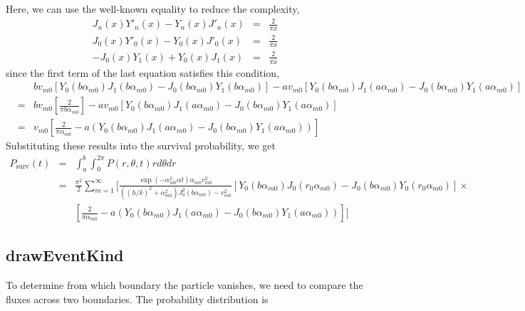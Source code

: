\documentclass{article}
\begin{document}
%
Here, we can use the well-known equality to reduce the complexity,
%
\begin{eqnarray}
    J_n(x)Y'_n(x) - Y_n(x)J'_n(x) &=& \frac{2}{\pi x} \\
    J_0(x)Y'_0(x) - Y_0(x)J'_0(x) &=& \frac{2}{\pi x} \nonumber\\
    -J_0(x)Y_1(x) + Y_0(x)J_1(x)  &=& \frac{2}{\pi x} \nonumber
\end{eqnarray}
%
since the first term of the last equation satisfies this condition,
%
\begin{eqnarray}
    & & bv_{m0}\left[Y_0(b\alpha_{m0})J_1(b\alpha_{m0}) - J_0(b\alpha_{m0})Y_1(b\alpha_{m0})\right] -
        av_{m0}\left[Y_0(b\alpha_{m0})J_1(a\alpha_{m0}) - J_0(b\alpha_{m0})Y_1(a\alpha_{m0})\right]
\nonumber\\
    &=& bv_{m0}\left[\frac{2}{\pi b\alpha_{m0}}\right] -
        av_{m0}\left[Y_0(b\alpha_{m0})J_1(a\alpha_{m0}) - J_0(b\alpha_{m0})Y_1(a\alpha_{m0})\right]
\nonumber\\
    &=& v_{m0}\left[\frac{2}{\pi\alpha_{m0}} - a\left(Y_0(b\alpha_{m0})J_1(a\alpha_{m0}) - J_0(b\alpha_{m0})Y_1(a\alpha_{m0})\right)\right]
\end{eqnarray}
%
Substituting these results into the survival probability, we get
%
\begin{eqnarray}
    P_{\mathrm{surv}}(t) &=& \int_a^b \int_0^{2\pi} P(r, \theta, t) rd\theta dr
\nonumber\\
    &=& \frac{\pi^2}{2} \sum_{m=1}^{\infty} \Bigg[
        \frac{\exp(-\alpha_{m0}^2\alpha t)\alpha_{m0}v_{m0}^2}
             {((h/k)^2 + \alpha_{m0}^2)J_0^2(b\alpha_{m0})-v_{m0}^2}
        \left[Y_0(b\alpha_{m0})J_0(r_0\alpha_{m0}) - J_0(b\alpha_{m0})Y_0(r_0\alpha_{m0})\right] \times
\nonumber\\
    & & \left[\frac{2}{\pi\alpha_{m0}} -
        a\left(Y_0(b\alpha_{m0})J_1(a\alpha_{m0}) - J_0(b\alpha_{m0})Y_1(a\alpha_{m0})\right)\right]
        \Bigg]
\nonumber
\end{eqnarray}

\subsection{drawEventKind}

To determine from which boundary the particle vanishes, we need to compare the fluxes
across two boundaries. The probability distribution is
\end{document}
